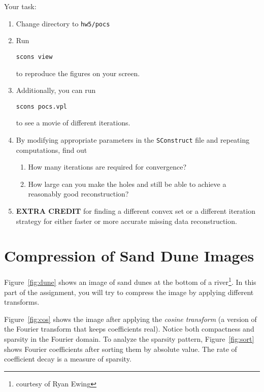


Your task:
\begin{enumerate}
\item Change directory to \texttt{hw5/pocs}
\item Run 
\begin{verbatim}
scons view
\end{verbatim}
to reproduce the figures on your screen.
\item Additionally, you can run
\begin{verbatim}
scons pocs.vpl
\end{verbatim}
to see a movie of different iterations.
\item By modifying appropriate parameters in the \texttt{SConstruct} file and repeating computations,
find out
\begin{enumerate}
\item How many iterations are required for convergence?
\item How large can you make the holes and still be able to achieve a reasonably good reconstruction?
\end{enumerate}
\item \textbf{EXTRA CREDIT} for finding a different convex set or a different iteration strategy for either faster or more accurate missing data reconstruction.
\end{enumerate}

\section{Compression of Sand Dune Images}


Figure~\ref{fig:dune} shows an image of sand dunes at the bottom of a
river\footnote{courtesy of Ryan Ewing}. In this part of the assignment, you
will try to compress the image by applying different transforms.


Figure~\ref{fig:cos} shows the image after applying the \emph{cosine
transform} (a version of the Fourier transform that keeps coefficients
real). Notice both compactness and sparsity in the Fourier domain. To
analyze the sparsity pattern, Figure~\ref{fig:sort} shows Fourier
coefficients after sorting them by absolute value. The rate 
of coefficient decay is a measure of sparsity.

